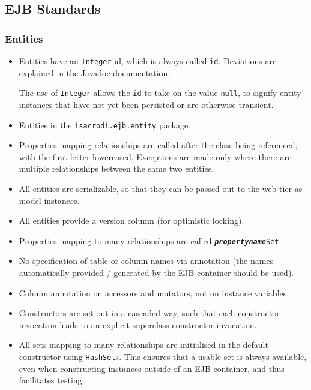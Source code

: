 \documentclass[a4paper,fleqn]{article}
\newcommand{\computercode}[1]{\texttt{#1}}
\newcommand{\computermeta}[1]{\texttt{\textbf{\textit{#1}}}}
\begin{document}
\subsection{EJB Standards}

\subsubsection{Entities}

\begin{itemize}

\item Entities have an \computercode{Integer} id, which is always
  called \computercode{id}. Deviations are explained in the Javadoc
  documentation.

  The use of \computercode{Integer} allows
  the \computercode{id} to take on the value \computercode{null}, to
  signify entity instances that have not yet been persisted or are
  otherwise transient.

\item Entities in the \computercode{isacrodi.ejb.entity} package.

\item Properties mapping relationships are called after the class
  being referenced, with the first letter lowercased. Exceptions are
  made only where there are multiple relationships between the same
  two entities.

\item All entities are serializable, so that they can be passed out to the
  web tier as model instances.

\item All entities provide a version column (for optimistic locking).

\item Properties mapping to-many relationships are called
  \computercode{\computermeta{propertyname}Set}.

\item No specification of table or column names via annotation (the
  names automatically provided / generated by the EJB container should
  be used).

\item Column annotation on accessors and mutators, not on instance
  variables.

\item Constructors are set out in a cascaded way, such that each
  constructor invocation leads to an explicit superclass constructor
  invocation.

\item All sets mapping to-many relationships are initialised in the
  default constructor using \computercode{HashSet}s. This ensures that
  a usable set is always available, even when constructing instances
  outside of an EJB container, and thus facilitates testing.

\end{itemize}
\end{document}
